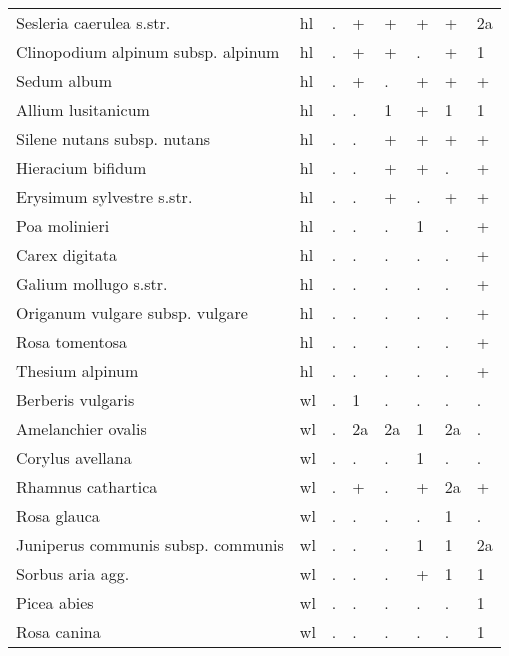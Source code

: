 \begin{longtable}{p{70mm}p{10mm}p{10mm}p{10mm}p{10mm}p{10mm}p{10mm}p{10mm}}
Sesleria caerulea s.str.&hl&.&+&+&+&+&2a\tabularnewline
Clinopodium alpinum subsp. alpinum&hl&.&+&+&.&+&1\tabularnewline
Sedum album&hl&.&+&.&+&+&+\tabularnewline
Allium lusitanicum&hl&.&.&1&+&1&1\tabularnewline
Silene nutans subsp. nutans&hl&.&.&+&+&+&+\tabularnewline
Hieracium bifidum&hl&.&.&+&+&.&+\tabularnewline
Erysimum sylvestre s.str.&hl&.&.&+&.&+&+\tabularnewline
Poa molinieri&hl&.&.&.&1&.&+\tabularnewline
Carex digitata&hl&.&.&.&.&.&+\tabularnewline
Galium mollugo s.str.&hl&.&.&.&.&.&+\tabularnewline
Origanum vulgare subsp. vulgare&hl&.&.&.&.&.&+\tabularnewline
Rosa tomentosa&hl&.&.&.&.&.&+\tabularnewline
Thesium alpinum&hl&.&.&.&.&.&+\tabularnewline
Berberis vulgaris&wl&.&1&.&.&.&.\tabularnewline
Amelanchier ovalis&wl&.&2a&2a&1&2a&.\tabularnewline
Corylus avellana&wl&.&.&.&1&.&.\tabularnewline
Rhamnus cathartica&wl&.&+&.&+&2a&+\tabularnewline
Rosa glauca&wl&.&.&.&.&1&.\tabularnewline
Juniperus communis subsp. communis&wl&.&.&.&1&1&2a\tabularnewline
Sorbus aria agg.&wl&.&.&.&+&1&1\tabularnewline
Picea abies&wl&.&.&.&.&.&1\tabularnewline
Rosa canina&wl&.&.&.&.&.&1\tabularnewline
\bottomrule
 \end{longtable}
  
